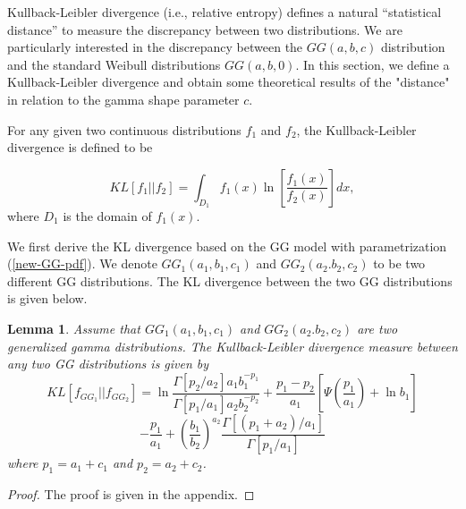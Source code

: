 \documentclass{ps}
\theoremstyle{plain}%
\newtheorem{lemma}[theorem]{Lemma}
\theoremstyle{definition}
\theoremstyle{remark}
\begin{document}
Kullback-Leibler \cite{Kullback-Leibler} divergence (i.e., relative entropy) defines a natural “statistical distance” to measure the discrepancy between two distributions. We are particularly interested in the discrepancy between the $GG (a, b, c)$ distribution and the standard Weibull distributions $GG(a, b, 0)$. In this section, we define a Kullback-Leibler divergence and obtain some theoretical results of the "distance" in relation to the gamma shape parameter $c$. 


For any given two continuous distributions $f_1$ and $f_2$, the Kullback-Leibler divergence is defined to be



\begin{equation}\label{KL-dist}
	KL[f_1||f_2] = \int_{D_1}f_1(x)\ln\left[ \frac{f_1(x)}{f_2(x)} \right] dx,
\end{equation}
\noindent where $D_1$ is the domain of $f_1(x)$.

We first derive the KL divergence based on the GG model with parametrization (\ref{new-GG-pdf}). We denote $GG_1(a_1, b_1, c_1)$ and $GG_2(a_2. b_2, c_2)$ to be two different GG distributions. The KL divergence between the two GG distributions is given below.

\begin{lemma}\label{lemma5.1}
	Assume that $GG_1(a_1, b_1, c_1)$ and $GG_2(a_2. b_2, c_2)$ are two generalized gamma distributions. The Kullback-Leibler divergence measure between any two GG distributions is given by        
	$$
	KL[f_{GG_1}||f_{GG_2}] = \ln \frac{\Gamma[p_2/a_2]a_1b_1^{-p_1}}{\Gamma[p_1/a_1]a_2b_2^{-p_2}} + \frac{p_1-p_2}{a_1}\left[ \Psi\left(\frac{p_1}{a_1} \right)+ \ln b_1\right]
	$$
	\begin{equation}
		-\frac{p_1}{a_1} + \left(\frac{b_1}{b_2} \right)^{a_2}\frac{\Gamma[(p_1+a_2)/a_1]}{\Gamma[p_1/a_1]}
	\end{equation}
	\noindent where $p_1 = a_1 + c_1$ and $p_2 = a_2 + c_2$.
\end{lemma}

\begin{proof}
	The proof is given in the appendix.	
\end{proof}
\end{document}
